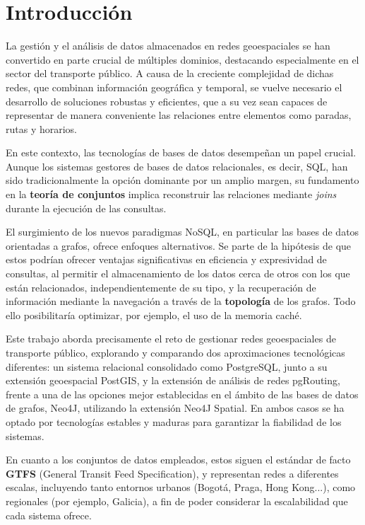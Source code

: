 
\chapter{Introducción}

La gestión y el análisis de datos almacenados en redes geoespaciales se han convertido en parte crucial de múltiples dominios, destacando especialmente en el sector del transporte público. A causa de la creciente complejidad de dichas redes, que combinan información geográfica y temporal, se vuelve necesario el desarrollo de soluciones robustas y eficientes, que a su vez sean capaces de representar de manera conveniente las relaciones entre elementos como paradas, rutas y horarios.

En este contexto, las tecnologías de bases de datos desempeñan un papel crucial. Aunque los sistemas gestores de bases de datos relacionales, es decir, SQL, han sido tradicionalmente la opción dominante por un amplio margen, su fundamento en la \textbf{teoría de conjuntos} implica reconstruir las relaciones mediante \textit{joins} durante la ejecución de las consultas.

El surgimiento de los nuevos paradigmas NoSQL, en particular las bases de datos orientadas a grafos, ofrece enfoques alternativos. Se parte de la hipótesis de que estos podrían ofrecer ventajas significativas en eficiencia y expresividad de consultas, al permitir el almacenamiento de los datos cerca de otros con los que están relacionados, independientemente de su tipo, y la recuperación de información mediante la navegación a través de la \textbf{topología} de los grafos. Todo ello posibilitaría optimizar, por ejemplo, el uso de la memoria caché.

Este trabajo aborda precisamente el reto de gestionar redes geoespaciales de transporte público, explorando y comparando dos aproximaciones tecnológicas diferentes: un sistema relacional consolidado como PostgreSQL, junto a su extensión geoespacial PostGIS, y la extensión de análisis de redes pgRouting, frente a una de las opciones mejor establecidas en el ámbito de las bases de datos de grafos, Neo4J, utilizando la extensión Neo4J Spatial. En ambos casos se ha optado por tecnologías estables y maduras para garantizar la fiabilidad de los sistemas.

En cuanto a los conjuntos de datos empleados, estos siguen el estándar de facto \textbf{GTFS} (General Transit Feed Specification), y representan redes a diferentes escalas, incluyendo tanto entornos urbanos (Bogotá, Praga, Hong Kong...), como regionales (por ejemplo, Galicia), a fin de poder considerar la escalabilidad que cada sistema ofrece.

